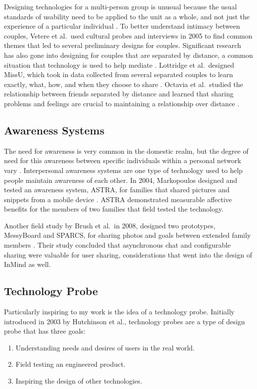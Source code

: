     Designing technologies for a multi-person group is unusual because the usual
    standards of usability need to be applied to the unit as a whole, and not just
    the experience of a particular individual \cite{neustaedter12}.
    To better understand intimacy between couples,
    Vetere et al.\ used cultural probes and interviews in 2005 to find
    common themes that led to several preliminary designs for couples.
    Significant research has also gone into designing for couples that are
    separated by distance,
    a common situation that technology is used to help mediate
    \cite{vetere05}.
    Lottridge et al.\ designed MissU, which took in data collected from several separated couples
    to learn exactly, what, how, and when they choose to share
    \cite{lottridge09}.
    Octavia et al.\ studied the relationship between friends separated by distance
    and learned that sharing problems and feelings are crucial to
    maintaining a relationship over distance
    \cite{octavia07}.

  \subsection{Awareness Systems}
    The need for awareness is very common in the domestic realm,
    but the degree of need for this awareness between specific individuals
    within a personal network vary
    \cite{neustaedter06}.
    Interpersonal awareness systems are one type of technology used to
    help people maintain awareness of each other.
    In 2004, Markopoulos designed and tested an
    awareness system, ASTRA, for families that shared pictures and snippets from a mobile
    device
    \cite{markopoulos04}.
    ASTRA demonstrated measurable affective benefits for the members of
    two families that field tested the technology.

    Another field study by Brush et al.\ in 2008,
    designed two prototypes, MessyBoard and SPARCS,
    for sharing photos and goals between extended family members
    \cite{brush08}.
    Their study concluded that asynchronous chat and configurable sharing were
    valuable for user sharing,
    considerations that went into the design of InMind as well.

  \subsection{Technology Probe}
    Particularly inspiring to my work is the idea of a technology probe.
    Initially introduced in 2003 by Hutchinson et al.,
    technology probes are a type of design probe that has three goals:
    \begin{enumerate}
    \item Understanding needs and desires of users in the real world.
    \item Field testing an engineered product.
    \item Inspiring the design of other technologies.
    \end{enumerate}

